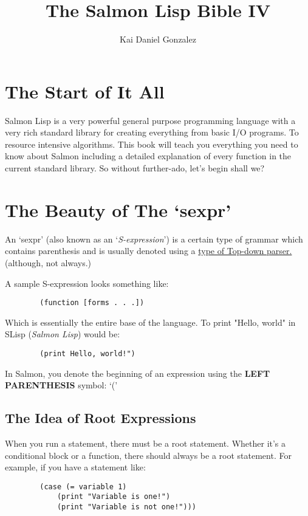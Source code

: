 \documentclass{article}
\title{The Salmon Lisp Bible IV}
\author{Kai Daniel Gonzalez}
\begin{document}
	\maketitle
	\tableofcontents
	\newpage
	\section{The Start of It All}
	Salmon Lisp is a very powerful general purpose programming language with a
	very rich standard library for creating everything from basic I/O programs. To resource intensive algorithms.
	\newline
	\newline
	This book will teach you everything you need to know about Salmon including a detailed explanation of every function in the current standard library. So without further-ado, let's begin shall we?
	\section{The Beauty of The `sexpr'}
	An `sexpr' (also known as an `\emph{S-expression}') is a certain type of grammar which
	contains parenthesis and is usually denoted using a \href{https://en.wikipedia.org/wiki/Top-down_parsing}{type of Top-down parser.} (although, not always.)
	
	A sample S-expression looks something like:

	\begin{lstlisting}
		(function [forms . . .])
	\end{lstlisting}

	Which is essentially the entire base of the language. To print "Hello, world" in SLisp (\emph{Salmon Lisp}) would be:
	
	\begin{lstlisting}
		(print Hello, world!")
	\end{lstlisting}

	In Salmon, you denote the beginning of an expression using the \textbf{LEFT PARENTHESIS} symbol: `('
	
	\subsection{The Idea of Root Expressions}
	When you run a statement, there must be a root statement. Whether it's a conditional block or a function, there should always be a root statement. For example, if you have a statement like:
	\begin{lstlisting}
		(case (= variable 1)
			(print "Variable is one!")
			(print "Variable is not one!")))
	\end{lstlisting}
\end{document}
